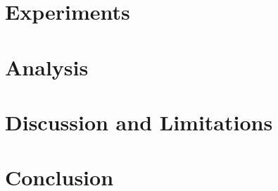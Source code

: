 \documentclass{article}
\begin{document}
\section{Experiments}

\section{Analysis}

\section{Discussion and Limitations}

\section{Conclusion}
\end{document}
